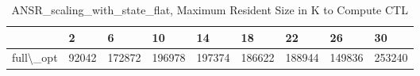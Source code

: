 \begin{table}
\centering
\caption{ANSR\_scaling\_with\_state\_flat, Maximum Resident Size in K to Compute CTL}
\label{ANSR_scaling_with_state_flat_CTL_size}
\begin{tabular}{lllllllll}
\toprule
{} &      2 &       6 &      10 &      14 &      18 &      22 &      26 &      30 \\
\midrule
full\textbackslash \_opt &  92042 &  172872 &  196978 &  197374 &  186622 &  188944 &  149836 &  253240 \\
\bottomrule
\end{tabular}
\end{table}
